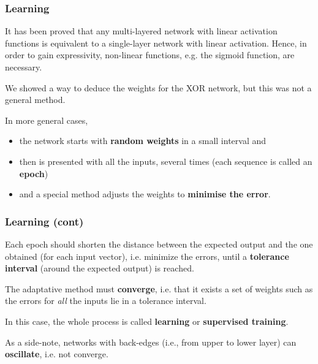 %
\begin{frame}
\frametitle{Learning}

It has been proved that any multi-layered network with linear
activation functions is equivalent to a single-layer network with
linear activation. Hence, in order to gain expressivity, non-linear
functions, e.g. the sigmoid function, are necessary.

\bigskip

We showed a way to deduce the weights for the XOR network, but this
was not a general method. 

\bigskip

In more general cases, 
\begin{itemize}
  
  \item the network starts with \textbf{random weights} in a small
  interval and 

  \item then is presented with all the inputs, several times (each
  sequence is called an \textbf{epoch})

  \item and a special method adjusts the weights to \textbf{minimise
  the error}.

\end{itemize}

\end{frame}

%
\begin{frame}
\frametitle{Learning (cont)}

Each epoch should shorten the distance between the expected output and
the one obtained (for each input vector), i.e. minimize the errors,
until a \textbf{tolerance interval} (around the expected output) is
reached. 

\bigskip

The adaptative method must \textbf{converge}, i.e. that it exists a
set of weights such as the errors for \emph{all} the inputs lie in a
tolerance interval.

\bigskip

In this case, the whole process is called \textbf{learning} or
\textbf{supervised training}.

\bigskip

As a side-note, networks with back-edges (i.e., from upper to lower
layer) can \textbf{oscillate}, i.e. not converge.

\end{frame}

